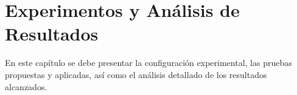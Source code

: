 \chapter{Experimentos y Análisis de Resultados}\label{experimentos}

\begin{tcolorbox}[width=\textwidth,colback={white},title={\textbf{Lineamientos del Capítulo Experimentos y Análisis de Resultados}},colbacktitle=black,coltitle=white]    
En este capítulo se debe presentar la configuración experimental, las pruebas propuestas y aplicadas, así como el análisis detallado de los resultados alcanzados.

\end{tcolorbox}    




